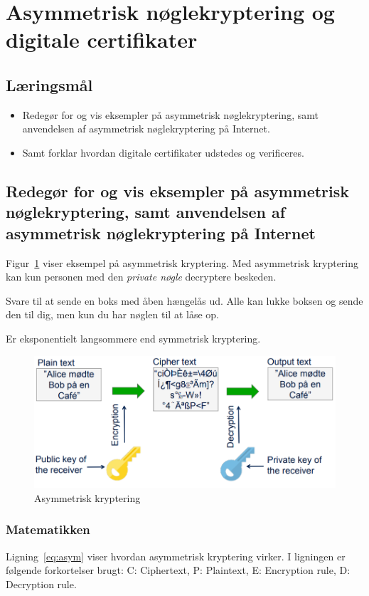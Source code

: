 \section{Asymmetrisk nøglekryptering og digitale certifikater}

\subsection{Læringsmål}

\begin{itemize}
	\item Redegør for og vis eksempler på asymmetrisk nøglekryptering, samt anvendelsen af
	asymmetrisk nøglekryptering på Internet.
	\item Samt forklar hvordan digitale certifikater udstedes og verificeres.
\end{itemize}

\subsection{Redegør for og vis eksempler på asymmetrisk nøglekryptering, samt anvendelsen af asymmetrisk nøglekryptering på Internet}\label{sec:asymmetric}
Figur~\ref{fig:asymmetrickeyenc} viser eksempel på asymmetrisk kryptering. Med asymmetrisk kryptering kan kun personen med den \textit{private nøgle} decryptere beskeden. 

Svare til at sende en boks med åben hængelås ud. Alle kan lukke boksen og sende den til dig, men kun du har nøglen til at låse op.

Er eksponentielt langsommere end symmetrisk kryptering.

\begin{figure}[H]
	\centering
	\includegraphics[width=0.7\linewidth]{figs/spm4/asymmetric_key_enc}
	\caption{Asymmetrisk kryptering}
	\label{fig:asymmetrickeyenc}
\end{figure}

\subsubsection{Matematikken}
Ligning~\ref{eq:asym} viser hvordan asymmetrisk kryptering virker. I ligningen er følgende forkortelser brugt: C: Ciphertext, P: Plaintext, E: Encryption rule, D: Decryption rule.

